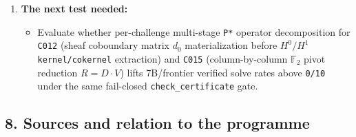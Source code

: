 \documentclass[
  11pt,
]{article}
\newcommand{\passthrough}[1]{#1}
\providecommand{\tightlist}{%
  \setlength{\itemsep}{0pt}\setlength{\parskip}{0pt}}
\begin{document}
\begin{enumerate}
  \begin{itemize}
  \tightlist
  \item
    Decomposing multi-constraint algebraic and cohomological tasks into
    bounded-arity \passthrough{\lstinline!P*!} Stage-1
    slot-materialization cuts guarded by complete deterministic
    linear/coboundary, path-integrated \(B_T^{-1}\), and independent
    certificate predicates
    (\(G_{\text{complete}},\allowbreak  G_{\text{complete}}^{\text{C006}},\allowbreak  G_T \wedge G_C,\allowbreak  G_{\text{Fredholm}},\allowbreak  G_{\text{cert}}^{(m)}\))
    with \passthrough{\lstinline!NullTree!} abstention enforces
    \textbf{\passthrough{\lstinline!100\%!} conditional Stage-2
    precision} (\passthrough{\lstinline!40/40!} across all admitted
    grafts in \passthrough{\lstinline!C004-S5!},
    \passthrough{\lstinline!C004-S6!},
    \passthrough{\lstinline!C006-S6!},
    \passthrough{\lstinline!C006-S7!},
    \passthrough{\lstinline!C006-S8!},
    \passthrough{\lstinline!C005-S1!},
    \passthrough{\lstinline!C001-S1!}, and
    \passthrough{\lstinline!B-COH-S1!}, with \passthrough{\lstinline!0!}
    admitted false verdicts) while converting unrecoverable model
    arithmetic or witness failures into zero-downstream-cost
    \passthrough{\lstinline!NullTree!} abstentions.
  \end{itemize}
\item
  \textbf{The next test needed:}

  \begin{itemize}
  \tightlist
  \item
    Evaluate whether per-challenge multi-stage
    \passthrough{\lstinline!P*!} operator decomposition for
    \passthrough{\lstinline!C012!} (sheaf coboundary matrix \(d_0\)
    materialization before \(H^0/H^1\) \nolinkurl{kernel/cokernel}
    extraction) and \passthrough{\lstinline!C015!} (column-by-column
    \(\mathbb{F}_2\) pivot reduction \(R = D \cdot V\)) lifts
    7B/frontier verified solve rates above
    \passthrough{\lstinline!0/10!} under the same fail-closed
    \nolinkurl{check_certificate} gate.
  \end{itemize}
\end{enumerate}

\subsection{8. Sources and relation to the
programme}\label{sources-and-relation-to-the-programme}
\end{document}
